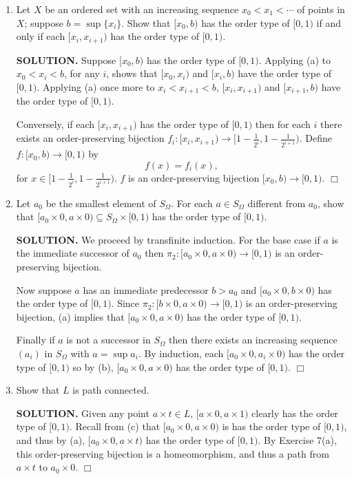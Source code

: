\documentclass{article}
\begin{document}
\begin{enumerate}
\begin{enumerate}
        \item Let $X$ be an ordered set with an increasing sequence $x_0 < x_1 < \cdots$ of points in $X$; suppose $b = \sup\{x_i\}$. Show that $[x_0, b)$ has the order type of $[0, 1)$ if and only if each $[x_i, x_{i+1})$ has the order type of $[0, 1)$.

        {\bf SOLUTION.} Suppose $[x_0, b)$ has the order type of $[0, 1)$. Applying (a) to $x_0 < x_i < b$, for any $i$, shows that $[x_0, x_i)$ and $[x_i, b)$ have the order type of $[0, 1)$. Applying (a) once more to $x_i < x_{i+1} < b$, $[x_i, x_{i+1})$ and $[x_{i+1}, b)$ have the order type of $[0, 1)$.

        Conversely, if each $[x_i, x_{i+1})$ has the order type of $[0, 1)$ then for each $i$ there exists an order-preserving bijection $f_i: [x_i, x_{i+1}) \rightarrow [1- \frac1{2^i}, 1 - \frac1{2^{i+1}})$. Define $f: [x_0, b) \rightarrow [0, 1)$ by
        $$f(x) = f_i(x),$$
        for $x \in [1- \frac1{2^i}, 1 - \frac1{2^{i+1}})$. $f$ is an order-preserving bijection $[x_0, b) \rightarrow [0, 1)$. $\Box$

        \item Let $a_0$ be the smallest element of $S_\Omega$. For each $a \in S_\Omega$ different from $a_0$, show that $[a_0 \times 0, a \times 0) \subseteq S_\Omega \times [0, 1)$ has the order type of $[0, 1)$.

        {\bf SOLUTION.} We proceed by transfinite induction. For the base case if $a$ is the immediate successor of $a_0$ then $\pi_2: [a_0 \times 0, a \times 0) \rightarrow [0, 1)$ is an order-preserving bijection.
        
        Now suppose $a$ has an immediate predecessor $b > a_0$ and $[a_0 \times 0, b \times 0)$ has the order type of $[0, 1)$. Since $\pi_2: [b \times 0, a \times 0) \rightarrow [0, 1)$ is an order-preserving bijection, (a) implies that $[a_0 \times 0, a \times 0)$ has the order type of $[0, 1)$.

        Finally if $a$ is not a successor in $S_\Omega$ then there exists an increasing sequence $(a_i)$ in $S_\Omega$ with $a = \sup a_i$. By induction, each $[a_0 \times 0, a_i \times 0)$ has the order type of $[0, 1)$ so by (b), $[a_0 \times 0, a \times 0)$ has the order type of $[0, 1)$. $\Box$
        
        \item Show that $L$ is path connected.

        {\bf SOLUTION.} Given any point $a \times t \in L$, $[a \times 0, a \times 1)$ clearly has the order type of $[0, 1)$. Recall from (c) that $[a_0 \times 0, a \times 0)$ is has the order type of $[0, 1)$, and thus by (a), $[a_0 \times 0, a \times t)$ has the order type of $[0, 1)$. By Exercise 7(a), this order-preserving bijection is a homeomorphism, and thus a path from $a \times t$ to $a_0 \times 0$. $\Box$
        

\end{enumerate}
\end{enumerate}
\end{document}
